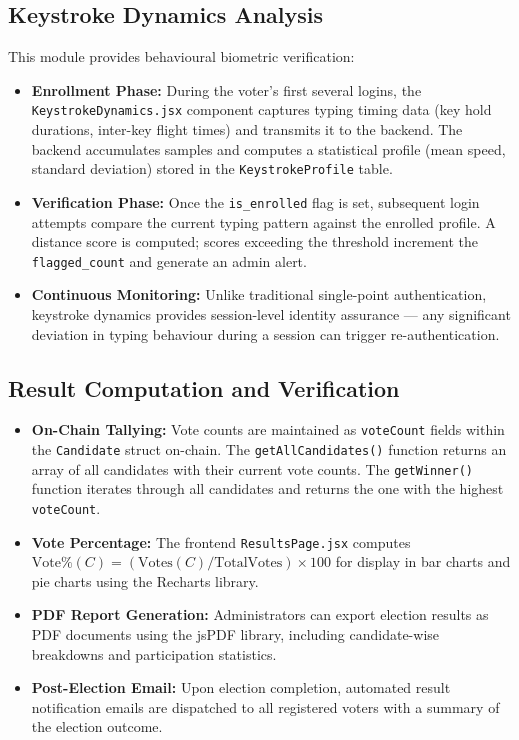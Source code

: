 \documentclass[oneside,a4paper,12pt]{book}
\begin{document}
\subsection{Keystroke Dynamics Analysis}
This module provides behavioural biometric verification:
\begin{itemize}[leftmargin=1.5cm]
    \item \textbf{Enrollment Phase:} During the voter's first several logins, the \texttt{KeystrokeDynamics.jsx} component captures typing timing data (key hold durations, inter-key flight times) and transmits it to the backend. The backend accumulates samples and computes a statistical profile (mean speed, standard deviation) stored in the \texttt{KeystrokeProfile} table.

    \item \textbf{Verification Phase:} Once the \texttt{is\_enrolled} flag is set, subsequent login attempts compare the current typing pattern against the enrolled profile. A distance score is computed; scores exceeding the threshold increment the \texttt{flagged\_count} and generate an admin alert.

    \item \textbf{Continuous Monitoring:} Unlike traditional single-point authentication, keystroke dynamics provides session-level identity assurance --- any significant deviation in typing behaviour during a session can trigger re-authentication.
\end{itemize}

\subsection{Result Computation and Verification}
\begin{itemize}[leftmargin=1.5cm]
    \item \textbf{On-Chain Tallying:} Vote counts are maintained as \texttt{voteCount} fields within the \texttt{Candidate} struct on-chain. The \texttt{getAllCandidates()} function returns an array of all candidates with their current vote counts. The \texttt{getWinner()} function iterates through all candidates and returns the one with the highest \texttt{voteCount}.

    \item \textbf{Vote Percentage:} The frontend \texttt{ResultsPage.jsx} computes $\text{Vote\%}(C) = (\text{Votes}(C) / \text{TotalVotes}) \times 100$ for display in bar charts and pie charts using the Recharts library.

    \item \textbf{PDF Report Generation:} Administrators can export election results as PDF documents using the jsPDF library, including candidate-wise breakdowns and participation statistics.

    \item \textbf{Post-Election Email:} Upon election completion, automated result notification emails are dispatched to all registered voters with a summary of the election outcome.
\end{itemize}
\end{document}
